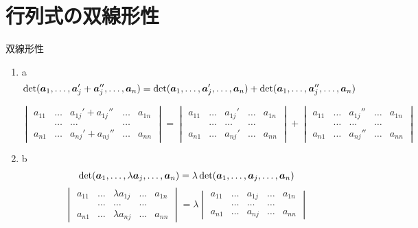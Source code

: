 \documentclass[leqno,autodetect-engine, dvipdfmx-if-dvi,ja=standard]{bxjsarticle}
\begin{document}
		
	\section{行列式の双線形性}
		\begin{thm} 双線形性
			\begin{enumerate}
				\item a
					\begin{equation}
						\det(\boldsymbol{a}_1, \dots, \boldsymbol{a}_j' + \boldsymbol{a}_j'', \dots, \boldsymbol{a}_n) = \det(\boldsymbol{a}_1, \dots, \boldsymbol{a}_j', \dots, \boldsymbol{a}_n) + \det(\boldsymbol{a}_1, \dots, \boldsymbol{a}_j'', \dots, \boldsymbol{a}_n)  
					\end{equation}
				
					\begin{equation}
						\begin{vmatrix}
							a_{1 1} & \dots & a_{1 j}' + a_{1 j}''  & \dots & a_{1 n} \\
							           & \dots &   \dots                & \dots &           \\
							a_{n 1} & \dots & a_{n j}' + a_{n j}'' & \dots & a_{n n}
						\end{vmatrix} 
						=
						\begin{vmatrix}
							a_{1 1} & \dots & a_{1 j}' & \dots & a_{1 n} \\
							& \dots &   \dots                & \dots &           \\
							a_{n 1} & \dots & a_{n j}' & \dots & a_{n n}
						\end{vmatrix} 
						+
						\begin{vmatrix}
							a_{1 1} & \dots & a_{1 j}''  & \dots & a_{1 n} \\
							& \dots &   \dots                & \dots &           \\
							a_{n 1} & \dots &  a_{n j}'' & \dots & a_{n n}
						\end{vmatrix}
					\end{equation}
				\item b
					\begin{equation}
						\det(\boldsymbol{a}_1, \dots, \lambda \boldsymbol{a}_j, \dots, \boldsymbol{a}_n) = \lambda \det(\boldsymbol{a}_1, \dots, \boldsymbol{a}_j, \dots, \boldsymbol{a}_n)
					\end{equation}
					\begin{equation}
						\begin{vmatrix}
							a_{1 1} & \dots & \lambda a_{1 j} & \dots & a_{1 n} \\
							& \dots &   \dots                & \dots &           \\
							a_{n 1} & \dots & \lambda a_{n j}  & \dots & a_{n n}
						\end{vmatrix} 
						= \lambda
						\begin{vmatrix}
							a_{1 1} & \dots & a_{1 j} & \dots & a_{1 n} \\
							& \dots &   \dots                & \dots &           \\
							a_{n 1} & \dots & a_{n j} & \dots & a_{n n}
						\end{vmatrix} 
					\end{equation}
			\end{enumerate}
		\end{thm}
\end{document}
